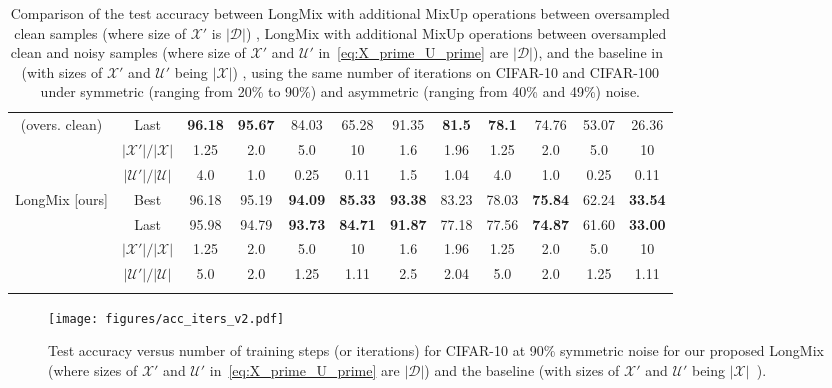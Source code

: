 \documentclass[review]{elsarticle}
\begin{document}
\begin{table}[ht]
{\begin{tabular}{cc|cccc|cc||cccc}
(overs. clean)  & Last & \textbf{96.18} & \textbf{95.67} & 84.03 & 65.28& 91.35 & \textbf{81.5} & \textbf{78.1} & 74.76 & 53.07 & 26.36 \\
   & $|\mathcal{X'}|/|\mathcal{X}|$ & 1.25 & 2.0 & 5.0 & 10 & 1.6 & 1.96 & 1.25 & 2.0 & 5.0& 10\\
  & $|\mathcal{U'}|/|\mathcal{U}|$ &  4.0 & 1.0 & 0.25 & 0.11 & 1.5 & 1.04 & 4.0 & 1.0 & 0.25& 0.11\\
\midrule
\multirow{2}{*}{LongMix [ours]   }& Best & 96.18 & 95.19 & \textbf{94.09} & \textbf{85.33} & \textbf{93.38} & 83.23 & 78.03 & \textbf{75.84} & 62.24 & \textbf{33.54}\\
 (overs. clean + noisy)   & Last & 95.98 & 94.79 & \textbf{93.73} & \textbf{84.71} &  \textbf{91.87} & 77.18 & 77.56 & \textbf{74.87} & 61.60 & \textbf{33.00}\\
     & $|\mathcal{X'}|/|\mathcal{X}|$ & 1.25 & 2.0 & 5.0 & 10 & 1.6 & 1.96 & 1.25 & 2.0 & 5.0& 10\\
  & $|\mathcal{U'}|/|\mathcal{U}|$ & 5.0 & 2.0 & 1.25 & 1.11 & 2.5 & 2.04 & 5.0 & 2.0 & 1.25& 1.11\\
\bottomrule \\
\end{tabular}
}
\caption{Comparison of the test accuracy between LongMix  with additional MixUp operations between oversampled clean samples (where size of $\mathcal{X}'$  is $|\mathcal{D}|$) , LongMix with additional MixUp operations between oversampled clean and noisy samples (where size of $\mathcal{X}'$ and $\mathcal{U}'$ in~\eqref{eq:X_prime_U_prime} are $|\mathcal{D}|$), and the baseline in~\cite{li2020dividemix}  (with sizes of $\mathcal{X}'$ and $\mathcal{U}'$ being $|\mathcal{X}|$)  , using the same number of iterations on CIFAR-10 and CIFAR-100 under symmetric (ranging from 20\% to 90\%) and asymmetric (ranging from 40\% and 49\%) noise.}
\label{tab:longmix_sameiter}
\end{table}



\begin{figure}[t]
\centering
\texttt{[image: figures/acc\_iters\_v2.pdf]}
\caption{Test accuracy versus number of training steps (or iterations) for CIFAR-10 at 90\% symmetric noise for our proposed LongMix (where sizes of $\mathcal{X}'$ and $\mathcal{U}'$ in~\eqref{eq:X_prime_U_prime} are $|\mathcal{D}|$) and the baseline (with sizes of $\mathcal{X}'$ and $\mathcal{U}'$ being $|\mathcal{X}|$~\cite{li2020dividemix}).
}
\label{fig:acc_iters}
\end{figure}
\end{document}
